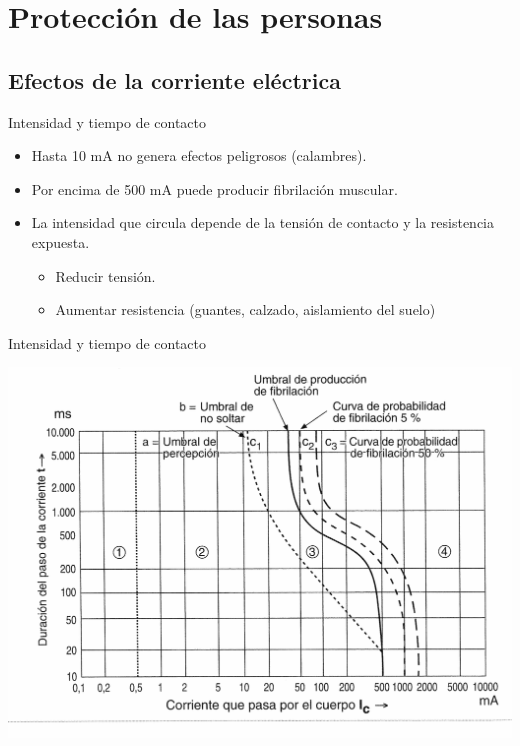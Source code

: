 \documentclass[xcolor={usenames,svgnames,dvipsnames}]{beamer}
\begin{document}
\section{Protección de las personas}
\label{sec:orgeff150a}

\subsection{Efectos de la corriente eléctrica}
\label{sec:org9947032}

\begin{frame}[label={sec:orgd8ca6b0}]{Intensidad y tiempo de contacto}
\begin{itemize}
\item Hasta 10 mA no genera efectos peligrosos (calambres).

\item Por encima de 500 mA puede producir fibrilación muscular.

\item La \alert{intensidad} que circula \alert{depende de la tensión de contacto y la
resistencia expuesta}.

\begin{itemize}
\item Reducir tensión.

\item Aumentar resistencia (guantes, calzado, aislamiento del suelo)
\end{itemize}
\end{itemize}
\end{frame}

\begin{frame}[label={sec:orge2b04bd}]{Intensidad y tiempo de contacto}
\begin{center}
\includegraphics[width=.9\linewidth]{../figs/CurvaIntensidadContactoTiempo.pdf}
\end{center}
\end{frame}
\end{document}
